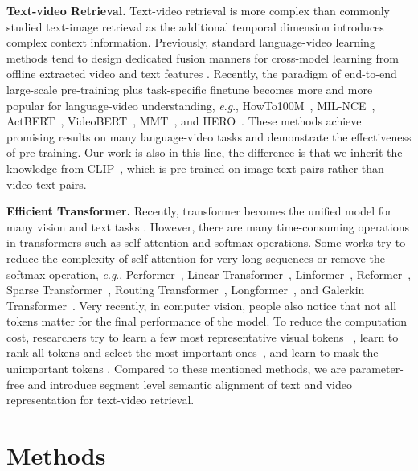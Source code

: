 \documentclass[sigconf]{acmart}
\newcommand{\eg}{\textit{e}.\textit{g}.}
\begin{document}
\noindent\textbf{Text-video Retrieval.}
Text-video retrieval is more complex than commonly
studied text-image retrieval as the additional temporal dimension
introduces complex context information.
Previously, standard language-video learning methods tend to
design dedicated fusion manners for cross-model
learning from offline extracted video and text features
\cite{yu2016video,yu2017end,le2020hierarchical,jang2017tgif, kaufman2017temporal,xu2017video}.
Recently, the paradigm of end-to-end large-scale pre-training plus task-specific finetune
becomes more and more popular for language-video understanding,
\eg, HowTo100M~\cite{miech2019howto100m}, MIL-NCE~\cite{miech2020end},
ActBERT~\cite{zhu2020actbert},
VideoBERT~\cite{sun2019videobert}, MMT~\cite{gabeur2020multi},
and HERO~\cite{li2020hero}.
These methods achieve promising results on many language-video tasks
and demonstrate the effectiveness of pre-training.
Our work is also in this line,
the difference is that we inherit the knowledge from CLIP~\cite{2021-clip},
which is pre-trained on image-text pairs rather than video-text pairs.


\noindent\textbf{Efficient Transformer.}
Recently, transformer becomes the unified model for many vision
and text tasks
\cite{DBLP:conf/nips/VaswaniSPUJGKP17,
radford2019language, 2021-vit, jaegle2021perceiver, liu2021swin}.
However, there are many time-consuming operations in transformers
such as self-attention and softmax operations.
Some works try to reduce the complexity of self-attention for very long sequences
or remove the softmax operation,
\eg, Performer~\cite{choromanski2020rethinking},
Linear Transformer~\cite{katharopoulos2020transformers},
Linformer~\cite{wang2020linformer}, Reformer~\cite{kitaev2020reformer},
Sparse Transformer~\cite{child2019generating},
Routing Transformer~\cite{roy2021efficient},
Longformer~\cite{beltagy2020longformer},
and Galerkin Transformer~\cite{Cao2021transformer}.
Very recently, in computer vision, people also notice
that not all tokens matter for the final performance
of the model.
To reduce the computation cost, researchers try to learn
a few most representative visual tokens
~\cite{ryoo2021tokenlearner,wu2020visual},
learn to rank all tokens and select the
most important ones~\cite{wang2021efficient},
and learn to mask the unimportant tokens
\cite{yin2021adavit, rao2021dynamicvit}.
Compared to these mentioned methods,
we are parameter-free
and introduce segment level semantic alignment of text
and video representation for text-video retrieval.


\section{Methods}
\end{document}
